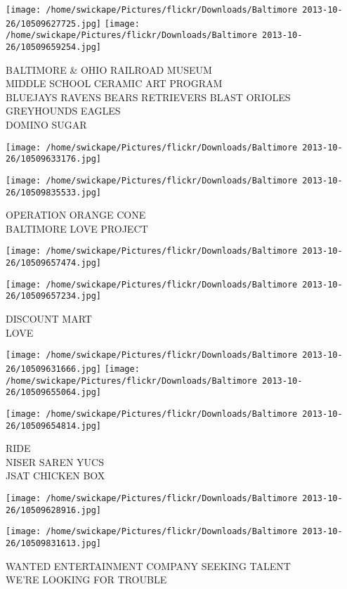 \documentclass[10pt,letterpaper]{article}
\begin{document}
\texttt{[image: /home/swickape/Pictures/flickr/Downloads/Baltimore 2013-10-26/10509627725.jpg]}
\texttt{[image: /home/swickape/Pictures/flickr/Downloads/Baltimore 2013-10-26/10509659254.jpg]}

BALTIMORE \& OHIO RAILROAD MUSEUM\\
MIDDLE SCHOOL CERAMIC ART PROGRAM\\
BLUEJAYS RAVENS BEARS RETRIEVERS BLAST ORIOLES GREYHOUNDS EAGLES\\
DOMINO SUGAR
\pagebreak

\texttt{[image: /home/swickape/Pictures/flickr/Downloads/Baltimore 2013-10-26/10509633176.jpg]}

\vspace{0.25in}
\texttt{[image: /home/swickape/Pictures/flickr/Downloads/Baltimore 2013-10-26/10509835533.jpg]}

OPERATION ORANGE CONE\\
BALTIMORE LOVE PROJECT
\pagebreak

\texttt{[image: /home/swickape/Pictures/flickr/Downloads/Baltimore 2013-10-26/10509657474.jpg]}

\vspace{0.25in}
\texttt{[image: /home/swickape/Pictures/flickr/Downloads/Baltimore 2013-10-26/10509657234.jpg]}

DISCOUNT MART\\
LOVE
\pagebreak

\texttt{[image: /home/swickape/Pictures/flickr/Downloads/Baltimore 2013-10-26/10509631666.jpg]}
\texttt{[image: /home/swickape/Pictures/flickr/Downloads/Baltimore 2013-10-26/10509655064.jpg]}

\texttt{[image: /home/swickape/Pictures/flickr/Downloads/Baltimore 2013-10-26/10509654814.jpg]}

RIDE\\
NISER SAREN YUCS\\
JSAT CHICKEN BOX
\pagebreak

\texttt{[image: /home/swickape/Pictures/flickr/Downloads/Baltimore 2013-10-26/10509628916.jpg]}

\vspace{0.25in}
\texttt{[image: /home/swickape/Pictures/flickr/Downloads/Baltimore 2013-10-26/10509831613.jpg]}

WANTED ENTERTAINMENT COMPANY SEEKING TALENT\\
WE'RE LOOKING FOR TROUBLE
\pagebreak
\end{document}
